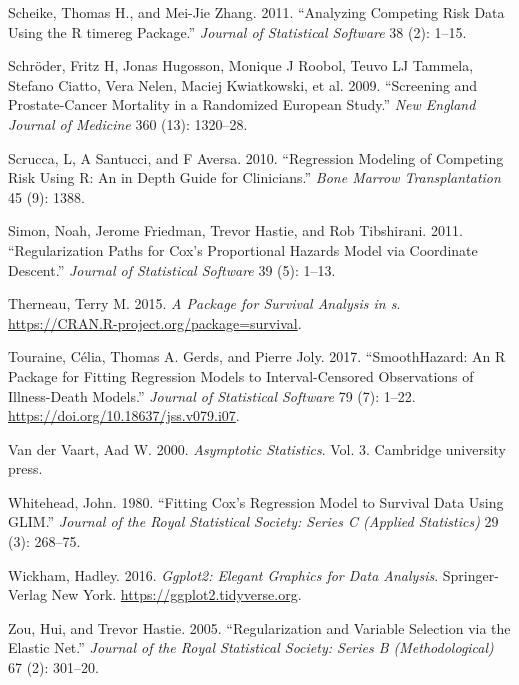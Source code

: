 \begin{CSLReferences}{1}{0}
\leavevmode{}%
Scheike, Thomas H., and Mei-Jie Zhang. 2011. {``Analyzing Competing Risk Data Using the {R} {timereg} Package.''} \emph{Journal of Statistical Software} 38 (2): 1--15.

\leavevmode{}%
Schröder, Fritz H, Jonas Hugosson, Monique J Roobol, Teuvo LJ Tammela, Stefano Ciatto, Vera Nelen, Maciej Kwiatkowski, et al. 2009. {``Screening and Prostate-Cancer Mortality in a Randomized {E}uropean Study.''} \emph{New England Journal of Medicine} 360 (13): 1320--28.

\leavevmode{}%
Scrucca, L, A Santucci, and F Aversa. 2010. {``Regression Modeling of Competing Risk Using {R}: An in Depth Guide for Clinicians.''} \emph{Bone Marrow Transplantation} 45 (9): 1388.

\leavevmode{}%
Simon, Noah, Jerome Friedman, Trevor Hastie, and Rob Tibshirani. 2011. {``Regularization Paths for {C}ox's Proportional Hazards Model via Coordinate Descent.''} \emph{Journal of Statistical Software} 39 (5): 1--13.

\leavevmode{}%
Therneau, Terry M. 2015. \emph{A Package for Survival Analysis in s}. \url{https://CRAN.R-project.org/package=survival}.

\leavevmode{}%
Touraine, Célia, Thomas A. Gerds, and Pierre Joly. 2017. {``{SmoothHazard}: An {R} Package for Fitting Regression Models to Interval-Censored Observations of Illness-Death Models.''} \emph{Journal of Statistical Software} 79 (7): 1--22. \url{https://doi.org/10.18637/jss.v079.i07}.

\leavevmode{}%
Van der Vaart, Aad W. 2000. \emph{Asymptotic Statistics}. Vol. 3. Cambridge university press.

\leavevmode{}%
Whitehead, John. 1980. {``Fitting Cox's Regression Model to Survival Data Using GLIM.''} \emph{Journal of the Royal Statistical Society: Series C (Applied Statistics)} 29 (3): 268--75.

\leavevmode{}%
Wickham, Hadley. 2016. \emph{Ggplot2: Elegant Graphics for Data Analysis}. Springer-Verlag New York. \url{https://ggplot2.tidyverse.org}.

\leavevmode{}%
Zou, Hui, and Trevor Hastie. 2005. {``Regularization and Variable Selection via the Elastic Net.''} \emph{Journal of the Royal Statistical Society: Series B (Methodological)} 67 (2): 301--20.

\end{CSLReferences}

